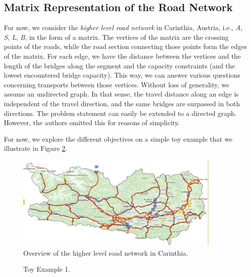 %
\subsection{Matrix Representation of the Road Network}

For now, we consider the \textit{higher level road network} in Carinthia, Austria,
i.e., \textit{A}, \textit{S}, \textit{L}, \textit{B}, in the  form of a matrix.
The vertices of the matrix are the crossing points of the roads, while
the road section connecting those points form the edges of the matrix.
For each edge, we have the distance between the vertices and the length of the bridges along the segment
and the capacity constraints (and the lowest encountered bridge capacity).
This way, we can answer various questions concerning transports between those vertices.
Without loss of generality, we assume an undirected graph.
In that sense, the travel distance along an edge is independent of
the travel direction, and  the same bridges are surpassed in both directions.
The problem statement can
easily be extended to a directed graph. However, the authors omitted this for reasons of simplicity.

For now, we explore the different objectives on a simple toy example that we illustrate in Figure \ref{fig_toy_example_1}.


\begin{figure}[!ht]
 \centering
  \includegraphics[width=0.9\textwidth]{map.jpg}
  \caption{Overview of the higher level road network in Carinthia.}
  \label{fig:higher level}
\end{figure}


\begin{figure}[!ht]
  \centering
  
  \caption{Toy Example 1.}
  \label{fig_toy_example_1}
\end{figure}
